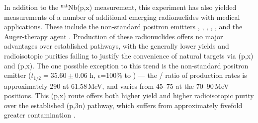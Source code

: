 In addition to the $^\text{nat}$Nb(p,x) measurement, this experiment has also yielded measurements of  a number of additional  emerging radionuclides with medical applications.
These include the non-standard positron emitters 
 \cite{PMID:7632762,zweit1996medium,Graves2016,Rosch2014}, 
 \cite{Lewis2003,Bandari2014,mp500671j,Szelecsenyi1993,Aslam2009,Hilgers2003,Szelecsenyi2005,Voyles2017},   \cite{Valdovinos2017,Nickles2003,Qaim2008,QaimSyedM2011,Rosch1993,doi:10.1139/v67-193,levkovski1991cross,Johnson2015,Singh2013,Kiselev1974,Kandil2009}, 
  \cite{Verel2003,Dijkers2009,Dijkers2010,PhysRevC.38.1624,Omara2009},  
 \cite{Busse2002,Radchenko2012},  
and the Auger-therapy agent  \cite{Kovacs1991,Titarenko2011}. 
Production of these radionuclides offers no major advantages over established pathways, with the generally lower yields and radioisotopic purities failing to justify the convenience of natural targets  via   (p,x) and  (p,x). 
The one possible exception to this trend is the non-standard positron emitter  ($t_{1/2}=35.60\pm0.06$ h, $\epsilon$=100\% to  \cite{Bhat1998}) --- the / ratio of production rates is approximately 290 at 61.58\,MeV, and varies from 45--75 at the 70--90\,MeV positions.
This (p,x) route offers both higher yield and higher radioisotopic purity over the established  (p,3n) pathway, which suffers from approximately fivefold greater   contamination \cite{MICHEL1997153,Ditrói2013}.




